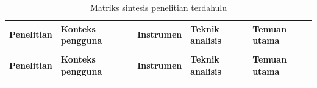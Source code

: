 \small
\begin{xltabular}{\textwidth}{
  >{\RaggedRight{}\hsize}X 
  >{\RaggedRight{}\hsize}X 
  >{\RaggedRight{}\hsize}X 
  >{\RaggedRight{}\hsize}X 
  >{\RaggedRight{}\hsize}X
}
\caption{Matriks sintesis penelitian terdahulu} \label{tab:sintesis} \\
\toprule
\textbf{Penelitian} & \textbf{Konteks pengguna} & \textbf{Instrumen} & \textbf{Teknik analisis} & \textbf{Temuan utama} \\
\midrule
\endfirsthead

 \\[0.5em]
\toprule
\textbf{Penelitian} & \textbf{Konteks pengguna} & \textbf{Instrumen} & \textbf{Teknik analisis} & \textbf{Temuan utama} \\
\midrule
\endhead

\midrule
\endfoot

\bottomrule
\endlastfoot


\end{xltabular}
